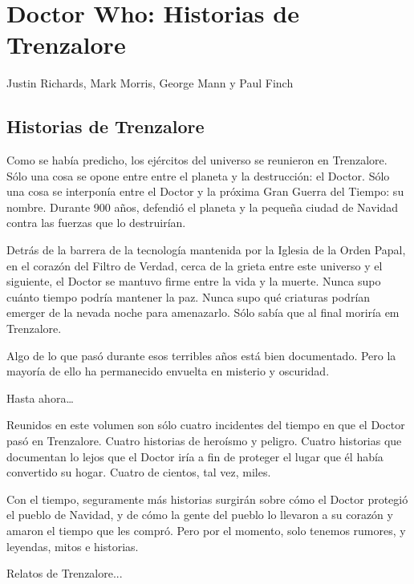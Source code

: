 \newpage

\section*{Doctor Who: Historias de Trenzalore}

\centerline{Justin Richards, Mark Morris, George Mann y Paul Finch}

\mbox{}

\subsection*{Historias de Trenzalore}

Como se había predicho, los ejércitos del universo se reunieron en Trenzalore. Sólo una cosa se opone entre entre el planeta y la destrucción: el Doctor. Sólo una cosa se interponía entre el Doctor y la próxima Gran Guerra del Tiempo: su nombre. Durante 900 años, defendió el planeta y la pequeña ciudad de Navidad contra las fuerzas que lo destruirían.

Detrás de la barrera de la tecnología mantenida por la Iglesia de la Orden Papal, en el corazón del Filtro de Verdad, cerca de la grieta entre este universo y el siguiente, el Doctor se mantuvo firme entre la vida y la muerte. Nunca supo cuánto tiempo podría mantener la paz. Nunca supo qué criaturas podrían emerger de la nevada noche para amenazarlo. Sólo sabía que al final moriría em Trenzalore.

Algo de lo que pasó durante esos terribles años está bien documentado. Pero la mayoría de ello
ha permanecido envuelta en misterio y oscuridad. 

Hasta ahora…

Reunidos en este volumen son sólo cuatro incidentes del tiempo en que el Doctor pasó en Trenzalore. Cuatro historias de heroísmo y peligro. Cuatro historias que documentan lo lejos que el Doctor iría a fin de proteger el lugar que él había convertido su hogar. Cuatro de cientos, tal vez, miles.

Con el tiempo, seguramente más historias surgirán sobre cómo el Doctor protegió el pueblo de Navidad, y de cómo la gente del pueblo lo llevaron a su corazón y amaron el tiempo que les compró. Pero por el momento, solo tenemos rumores, y leyendas, mitos e historias.

Relatos de Trenzalore...